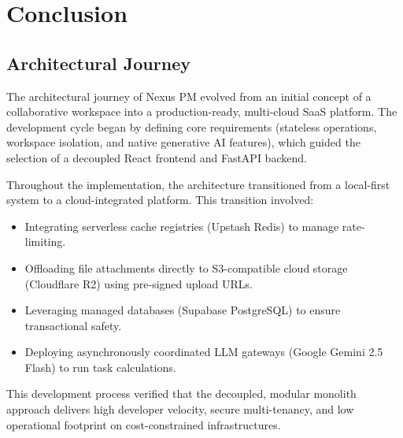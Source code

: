 \chapter{Conclusion}
\label{chap:conclusion}

\section{Architectural Journey}
The architectural journey of Nexus PM evolved from an initial concept of a collaborative workspace into a production-ready, multi-cloud SaaS platform. The development cycle began by defining core requirements (stateless operations, workspace isolation, and native generative AI features), which guided the selection of a decoupled React frontend and FastAPI backend.

Throughout the implementation, the architecture transitioned from a local-first system to a cloud-integrated platform. This transition involved:
\begin{itemize}
    \item Integrating serverless cache registries (Upstash Redis) to manage rate-limiting.
    \item Offloading file attachments directly to S3-compatible cloud storage (Cloudflare R2) using pre-signed upload URLs.
    \item Leveraging managed databases (Supabase PostgreSQL) to ensure transactional safety.
    \item Deploying asynchronously coordinated LLM gateways (Google Gemini 2.5 Flash) to run task calculations.
\end{itemize}

This development process verified that the decoupled, modular monolith approach delivers high developer velocity, secure multi-tenancy, and low operational footprint on cost-constrained infrastructures.

